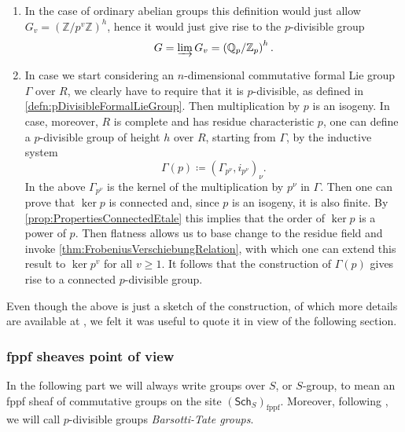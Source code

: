\documentclass[../Main]{subfiles}
\begin{document}
\begin{ex}\leavevmode\vspace{-.2\baselineskip}\label{ex:pDivGroups}
\begin{enumerate}
\item In the case of ordinary abelian groups this definition would just allow
	$G_v = \left( \mathbb{Z}/p^v\mathbb{Z} \right)^h$, hence
	it would just give rise to the $p$-divisible group
	\begin{equation*}
		G = \varinjlim G_v = \left( \mathbb{Q}_p / \mathbb{Z}_p \right)^h
	.\end{equation*} 
\item In case we start considering an $n$-dimensional commutative\label{ex:ConnectedpDivGroupFLG}
	formal Lie group $\Gamma$ over $R$, we clearly have to require that it is $p$-divisible,
	as defined in \cref{defn:pDivisibleFormalLieGroup}.
	Then multiplication by $p$ is an isogeny.
	In case, moreover, $R$ is complete and has residue characteristic $p$,
	one can define a $p$-divisible group of height $h$
	over $R$, starting from $\Gamma$, by the inductive system
	\begin{equation*}
		\Gamma(p) \coloneqq \left(\Gamma_{p^\nu}, i_{p^\nu}\right)_\nu
	.\end{equation*} 
	In the above $\Gamma_{p^\nu}$ is the kernel of
	the multiplication by $p^\nu$ in $\Gamma$.
	Then one can prove that $\ker p$ is connected and,
	since $p$ is an isogeny, it is also finite.
	By \cref{prop:PropertiesConnectedEtale} this implies that
	the order of $\ker p$ is a power of $p$.
	Then flatness allows us to base change to the residue field and invoke
	\cref{thm:FrobeniusVerschiebungRelation}, with which one can extend 
	this result to $\ker p^v$ for all $v \geq 1$.
	It follows that the construction of $\Gamma(p)$
	gives rise to a connected $p$-divisible group.
\end{enumerate}
\end{ex}


\begin{rem}[]
	Even though the above is just a sketch of the construction, of which more details
	are available at \cite[\S6]{Shatz},
	we felt it was useful to quote it in view of the following section.
\end{rem}



\subsubsection{fppf sheaves point of view}
In the following part we will always write groups over $S$, or $S$-group, to mean
an fppf sheaf of commutative groups on the site $(\mathsf{Sch}_{ S })_{\mathrm{fppf}}$.
Moreover, following \cite{Messing}, we will call $p$-divisible groups
{\em Barsotti-Tate groups}.
\end{document}
